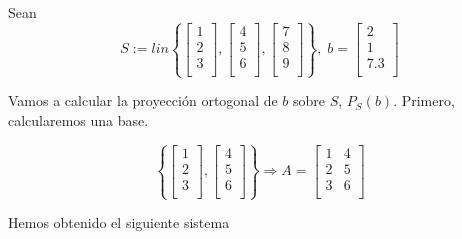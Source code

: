 \begin{ejemplo}
Sean
$$S := lin \left\lbrace \begin{bmatrix}
1 \\
2 \\
3 \\
\end{bmatrix}, 
\begin{bmatrix}
4 \\
5 \\
6 \\
\end{bmatrix},
\begin{bmatrix}
7 \\
8 \\
9 \\
\end{bmatrix}
\right\rbrace
,
\;
b = \begin{bmatrix}
2 \\
1 \\
7.3 \\
\end{bmatrix}$$

Vamos a calcular la proyección ortogonal de $b$ sobre $S$, $P_S(b)$. Primero, calcularemos una base.

$$\left\lbrace \begin{bmatrix}
1 \\
2 \\
3 \\
\end{bmatrix} , 
\begin{bmatrix}
4 \\
5 \\
6 \\
\end{bmatrix}
\right\rbrace
\Rightarrow
A = \begin{bmatrix}
1 & 4 \\
2 & 5 \\
3 & 6 \\
\end{bmatrix}$$

Hemos obtenido el siguiente sistema


\end{ejemplo}

